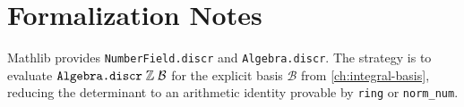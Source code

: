 \section{Formalization Notes}

\begin{remark}
  Mathlib provides \texttt{NumberField.discr} and
  \texttt{Algebra.discr}.  The strategy is to evaluate
  $\texttt{Algebra.discr}\;\mathbb{Z}\;\mathcal{B}$ for the explicit
  basis $\mathcal{B}$ from \cref{ch:integral-basis}, reducing
  the determinant to an arithmetic identity provable by
  \texttt{ring} or \texttt{norm\_num}.
\end{remark}
